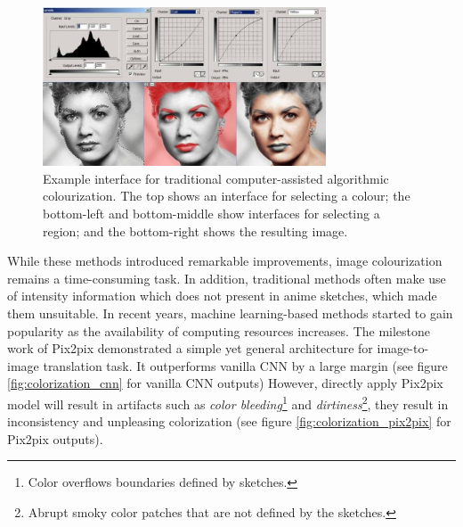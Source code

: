 \begin{figure}
    \centering
    \includegraphics[width=0.75\textwidth]{images/colorization/computer_assisted_colorization.jpg}
    \caption{Example interface for traditional computer-assisted algorithmic colourization. The top shows an interface for selecting a colour; the bottom-left and bottom-middle show interfaces for selecting a region; and the bottom-right shows the resulting image.\cite{ColorizeBlackWhite}}
    \label{fig:computer_assisted_colorization}
\end{figure}

While these methods introduced remarkable improvements, image colourization remains a time-consuming task. In addition, traditional methods often make use of intensity information which does not present in anime sketches, which made them unsuitable. In recent years, machine learning-based methods started to gain popularity as the availability of computing resources increases. The milestone work of Pix2pix\cite{isolaImagetoImageTranslationConditional2018} demonstrated a simple yet general architecture for image-to-image translation task. It outperforms vanilla CNN by a large margin (see figure \ref{fig:colorization_cnn} for vanilla CNN outputs) However, directly apply Pix2pix model will result in artifacts such as \textit{color bleeding}\footnote{Color overflows boundaries defined by sketches.} and \textit{dirtiness}\footnote{Abrupt smoky color patches that are not defined by the sketches.}, they result in inconsistency and unpleasing colorization (see figure \ref{fig:colorization_pix2pix} for Pix2pix outputs). 

